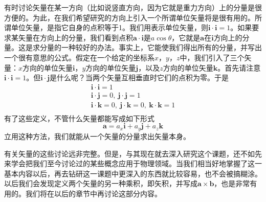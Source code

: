 有时讨论矢量在某一方向（比如说竖直方向，因为它就是重力方向）上的分量是很方便的。为此，在我们希望研究的方向上引入一个所谓单位矢量将是很有用的。所谓单位矢量，是指它自身的点积等于1。我们用表示单位矢量，则$\boldsymbol{i} \cdot \boldsymbol{i}=1$。如果要求某矢量在方向上的分量，我们看到点积$\boldsymbol{a} \cdot \boldsymbol{i}$是$a\cos\theta$，它就是$\boldsymbol{a}$在$\boldsymbol{i}$方向上的分量。这是求分量的一种较好的办法。事实上，它能使我们得出所有的分量，并写出一个很有意思的公式。假定在一个给定的坐标系$x$，$y$，$z$中，我们引入了三个矢量：$x$方向的单位矢量$\boldsymbol{i}$，$y$方向的单位矢量$\boldsymbol{j}$，以及$z$方向的单位矢量$\boldsymbol{k}$。首先请注意$\boldsymbol{i} \cdot \boldsymbol{i}=1$。但$\boldsymbol{i} \cdot \boldsymbol{j}$是什么呢？当两个矢量互相垂直时它们的点积为零。于是
\begin{equation}
    \label{Eq:I:11:24}
    \begin{split}
        \boldsymbol{i} \cdot \boldsymbol{i}=1 \\
        \boldsymbol{i} \cdot \boldsymbol{j}=0,~\boldsymbol{j} \cdot \boldsymbol{j}=1 \\
        \boldsymbol{i} \cdot \boldsymbol{k}=0,~\boldsymbol{j} \cdot \boldsymbol{k}=0,~\boldsymbol{k} \cdot \boldsymbol{k}=1 \\
    \end{split}
\end{equation}
有了这些定义，不管什么矢量都能写成如下形式
\begin{equation}
    \label{Eq:I:11:25}
    \boldsymbol{a}=a_x\boldsymbol{i}+a_y\boldsymbol{j}+a_z\boldsymbol{k}
\end{equation}
立用这种方法，我们就能从一个矢量的分量求出矢量本身。

有关矢量的这些讨论远非完整。但是，与其现在就去深入研究这个课题，还不如先来学会把我们至今讨论过的某些概念应用于物理领域。当我们相当好地掌握了这一基本内容以后，再去钻研这一课题中更深入的东西就比较容易，也不会被搞糊涂。以后我们会发现定义两个矢量的另一种乘积，即矢积，并写成$\boldsymbol{a} \times \boldsymbol{b}$，也是非常有用的。我们将在以后的章节中再讨论这部分内容。